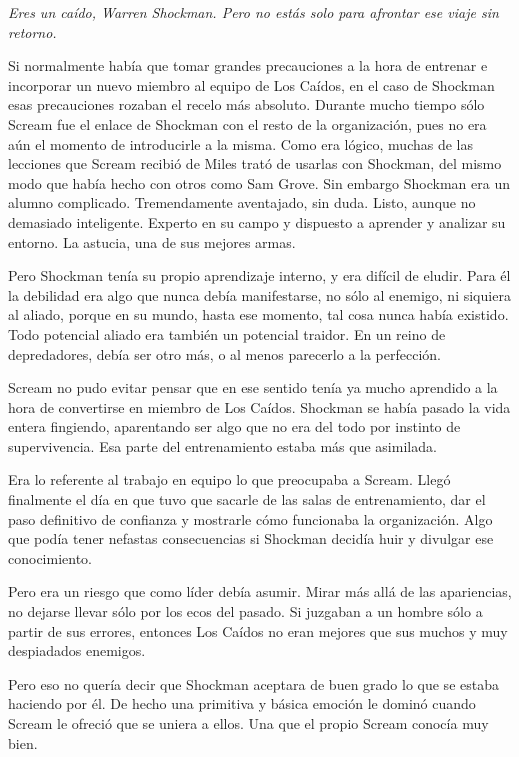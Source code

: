 \emph{Eres un caído, Warren Shockman. Pero no estás solo para afrontar ese viaje sin retorno.}

\parbreak
Si normalmente había que tomar grandes precauciones a la hora de entrenar e incorporar un nuevo miembro al equipo de Los Caídos, en el caso de Shockman esas precauciones rozaban el recelo más absoluto. Durante mucho tiempo sólo Scream fue el enlace de Shockman con el resto de la organización, pues no era aún el momento de introducirle a la misma. Como era lógico, muchas de las lecciones que Scream recibió de Miles trató de usarlas con Shockman, del mismo modo que había hecho con otros como Sam Grove. Sin embargo Shockman era un alumno complicado. Tremendamente aventajado, sin duda. Listo, aunque no demasiado inteligente. Experto en su campo y dispuesto a aprender y analizar su entorno. La astucia, una de sus mejores armas.

Pero Shockman tenía su propio aprendizaje interno, y era difícil de eludir. Para él la debilidad era algo que nunca debía manifestarse, no sólo al enemigo, ni siquiera al aliado, porque en su mundo, hasta ese momento, tal cosa nunca había existido. Todo potencial aliado era también un potencial traidor. En un reino de depredadores, debía ser otro más, o al menos parecerlo a la perfección.

Scream no pudo evitar pensar que en ese sentido tenía ya mucho aprendido a la hora de convertirse en miembro de Los Caídos. Shockman se había pasado la vida entera fingiendo, aparentando ser algo que no era del todo por instinto de supervivencia. Esa parte del entrenamiento estaba más que asimilada.

Era lo referente al trabajo en equipo lo que preocupaba a Scream. Llegó finalmente el día en que tuvo que sacarle de las salas de entrenamiento, dar el paso definitivo de confianza y mostrarle cómo funcionaba la organización. Algo que podía tener nefastas consecuencias si Shockman decidía huir y divulgar ese conocimiento.

Pero era un riesgo que como líder debía asumir. Mirar más allá de las apariencias, no dejarse llevar sólo por los ecos del pasado. Si juzgaban a un hombre sólo a partir de sus errores, entonces Los Caídos no eran mejores que sus muchos y muy despiadados enemigos.

Pero eso no quería decir que Shockman aceptara de buen grado lo que se estaba haciendo por él. De hecho una primitiva y básica emoción le dominó cuando Scream le ofreció que se uniera a ellos. Una que el propio Scream conocía muy bien.

